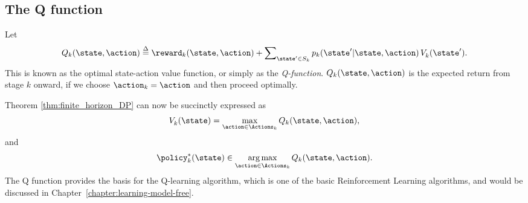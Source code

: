 \subsection{The Q function}
Let
\[{Q_k}(\state,\action) \buildrel \Delta \over = {\reward_k}(\state,\action) + \sum\nolimits_{\state' \in {S_k}} {{p_k}(\state'|\state,\action)\,V_k^{}(\state')} .\]
This is known as the optimal state-action value function, or simply
as the \emph{Q-function}. ${Q_k}(\state,\action)$ is the expected
return from stage $k$ onward, if we choose ${\action_k} = \action$
and then proceed optimally.

Theorem \ref{thm:finite_horizon_DP} can now be succinctly expressed as
\[V_k^{}(\state) = \mathop {\max }\limits_{\action \in {\Actions_k}} {Q_k}(\state,\action),\]
and
\[\policy _k^*(\state) \in \mathop {\arg \max }\limits_{\action \in {\Actions_k}} {Q_k}(\state,\action).\]
The Q function provides the basis for the Q-learning algorithm,
which is one of the basic Reinforcement Learning algorithms, and
would be discussed in Chapter~\ref{chapter:learning-model-free}.


